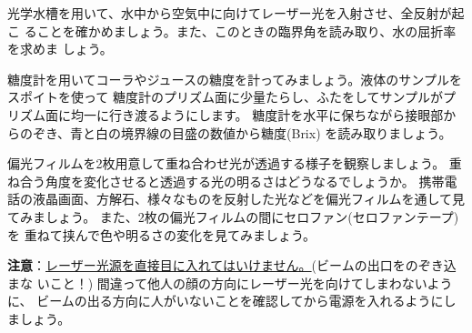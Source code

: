\bigskip


光学水槽を用いて、水中から空気中に向けてレーザー光を入射させ、全反射が起こ
ることを確かめましょう。また、このときの臨界角を読み取り、水の屈折率を求めま
しょう。

\bigskip


\newpage


糖度計を用いてコーラやジュースの糖度を計ってみましょう。液体のサンプルをスポイトを使って
糖度計のプリズム面に少量たらし、ふたをしてサンプルがプリズム面に均一に行き渡るようにします。
糖度計を水平に保ちながら接眼部からのぞき、青と白の境界線の目盛の数値から糖度(Brix)
を読み取りましょう。

\bigskip



偏光フィルムを2枚用意して重ね合わせ光が透過する様子を観察しましょう。
重ね合う角度を変化させると透過する光の明るさはどうなるでしょうか。
携帯電話の液晶画面、方解石、様々なものを反射した光などを偏光フィルムを通して見てみましょう。
また、2枚の偏光フィルムの間にセロファン(セロファンテープ)を
重ねて挟んで色や明るさの変化を見てみましょう。

\bigskip



\hspace*{-\parindent}
{\bf 注意}：\underline{レーザー光源を直接目に入れてはいけません。}(ビームの出口をのぞき込まな 
いこと！) 間違って他人の顔の方向にレーザー光を向けてしまわないように、
ビームの出る方向に人がいないことを確認してから電源を入れるようにしましょう。


